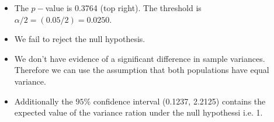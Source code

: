 \documentclass[a4paper,12pt]{article}
\begin{document}
	\begin{itemize}
		\item The $p-$value is 0.3764 (top right). The threshold is $\alpha/2 = (0.05/2) = 0.0250$.
		\item We fail to reject the null hypothesis. \medskip
		\item We don't have evidence of a significant difference in sample variances. Therefore we can use the assumption that both populations have equal variance. \medskip
		\item Additionally the $95\%$ confidence interval (0.1237, 2.2125) contains the expected value of the variance ration under the null hypothessi i.e. 1.
	\end{itemize}
	
\end{document}
